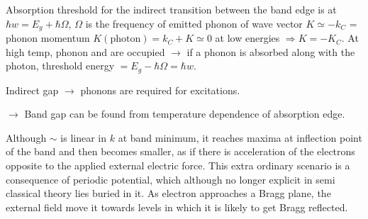 Absorption threshold for the indirect transition between the band edge is at $\hbar w=E_{g}+\hbar\Omega$, $\Omega$ is the frequency of emitted phonon of wave vector $K\simeq -k_{C}$ = phonon momentum $K(\text{photon})=k_{C}+K\simeq 0$ at low energies $\Rightarrow K=-K_{C}$. At high temp, phonon and are occupied $\to$ if a phonon is absorbed along with the photon, threshold energy $=E_{g}-\hbar\Omega=\hbar w$.

Indirect gap $\to$ phonons are required for excitations.

$\to$ Band gap can be found from temperature dependence of absorption edge.

Although $\sim$ is linear in $k$ at band minimum, it reaches maxima at inflection  point of the band and then becomes smaller, as if there is acceleration of the electrons opposite to the applied external electric force. This extra ordinary scenario is a consequence of periodic potential, which although no longer explicit in semi classical theory lies buried in it. As electron approaches a Bragg plane, the external field move it towards levels in which it is likely to get Bragg reflected.





